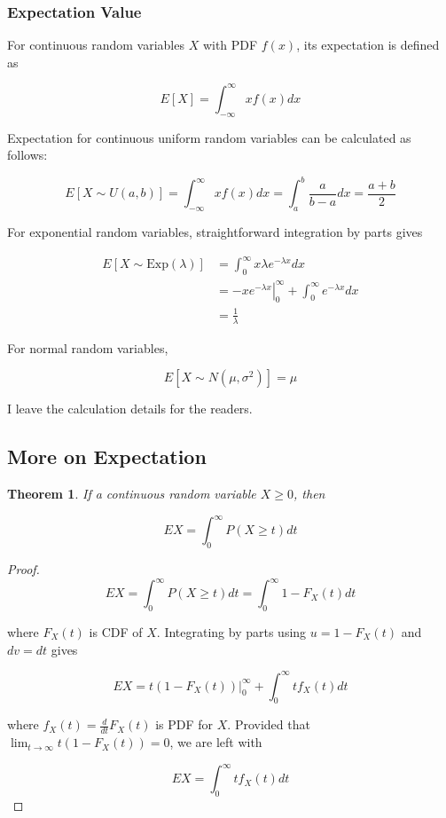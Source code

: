 \documentclass[12pt, a4paper]{article}
\newtheorem*{theorem}{Theorem}
\begin{document}
\subsubsection{Expectation Value}

For continuous random variables $X$ with PDF $f(x)$, its expectation is defined as

$$E[X]=\int_{-\infty}^\infty xf(x) dx$$

Expectation for continuous uniform random variables can be calculated as follows:

$$E[X\sim U(a,b)]=\int_{-\infty}^\infty xf(x) dx=\int_a^b \frac{a}{b-a} dx=\frac{a+b}{2}$$

For exponential random variables, straightforward integration by parts gives

\begin{align*}
E[X\sim\text{Exp}(\lambda)]&=\int_0^\infty x\lambda e^{-\lambda x} dx \\
&=\left. -xe^{-\lambda x} \right\vert_0^\infty + \int_0^\infty e^{-\lambda x} dx \\
&=\frac{1}{\lambda}
\end{align*}

For normal random variables,

$$E[X\sim N(\mu, \sigma^2)]=\mu$$

I leave the calculation details for the readers. \\

\subsection{More on Expectation}

\begin{theorem}
If a continuous random variable $X \ge 0$, then

\[ EX=\int_0^\infty P(X\ge t) dt \]
\end{theorem}

\begin{proof}
\[ EX = \int_0^\infty P(X\ge t) dt = \int_0^\infty 1-F_X(t) dt \]

where $F_X(t)$ is CDF of $X$. Integrating by parts using $u=1-F_X(t)$ and $dv=dt$ gives

\[ EX = \left. t (1-F_X(t)) \right\vert_0^\infty + \int_0^\infty t f_X(t) dt \]

where $f_X(t)=\frac{d}{dt}F_X(t)$ is PDF for $X$. Provided that $\lim_{t\to\infty} t (1-F_X(t)) = 0$, we are left with

\[ EX = \int_0^\infty t f_X(t) dt \]
\end{proof}
\end{document}
